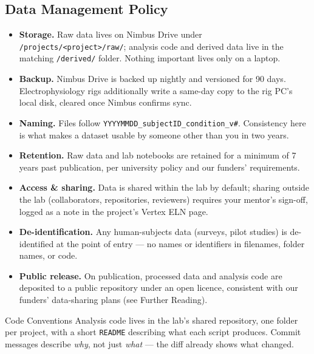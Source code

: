 \subsection*{Data Management Policy}
\begin{itemize}[leftmargin=1.3em]
  \item \textbf{Storage.} Raw data lives on Nimbus Drive under
        \texttt{/projects/\textless project\textgreater/raw/}; analysis code and derived
        data live in the matching \texttt{/derived/} folder. Nothing important lives only on
        a laptop.
  \item \textbf{Backup.} Nimbus Drive is backed up nightly and versioned for 90 days.
        Electrophysiology rigs additionally write a same-day copy to the rig PC's local disk,
        cleared once Nimbus confirms sync.
  \item \textbf{Naming.} Files follow \texttt{YYYYMMDD\_subjectID\_condition\_v\#}. Consistency
        here is what makes a dataset usable by someone other than you in two years.
  \item \textbf{Retention.} Raw data and lab notebooks are retained for a minimum of 7 years
        past publication, per university policy and our funders' requirements.
  \item \textbf{Access \& sharing.} Data is shared within the lab by default; sharing outside
        the lab (collaborators, repositories, reviewers) requires your mentor's sign-off,
        logged as a note in the project's Vertex ELN page.
  \item \textbf{De-identification.} Any human-subjects data (surveys, pilot studies) is
        de-identified at the point of entry --- no names or identifiers in filenames, folder
        names, or code.
  \item \textbf{Public release.} On publication, processed data and analysis code are
        deposited to a public repository under an open licence, consistent with our funders'
        data-sharing plans (see Further Reading).
\end{itemize}

\begin{factbox}{Code Conventions}
Analysis code lives in the lab's shared repository, one folder per project, with a short
\texttt{README} describing what each script produces. Commit messages describe \emph{why}, not
just \emph{what} --- the diff already shows what changed.
\end{factbox}
